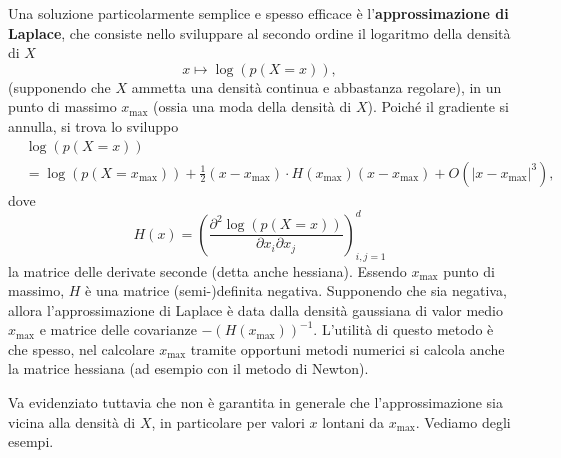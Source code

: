 \documentclass[
  italian,
  letterpaper,
]{book}
\newcommand{\bra}[1]{\left( #1 \right)}
\theoremstyle{definition}
\theoremstyle{remark}
\begin{document}
Una soluzione particolarmente semplice e spesso efficace è
l'\textbf{approssimazione di Laplace}, che consiste nello sviluppare al
secondo ordine il logaritmo della densità di \(X\)
\[ x \mapsto \log( p(X=x)),\] (supponendo che \(X\) ammetta una densità
continua e abbastanza regolare), in un punto di massimo \(x_{{\max}}\)
(ossia una moda della densità di \(X\)). Poiché il gradiente si annulla,
si trova lo sviluppo \[ \begin{split} & \log( p(X = x) ) \\
& = \log( p(X= x_{{\max}})) + \frac  12 (x-x_{{\max}}) \cdot  H(x_{{\max}}) (x-x_{{\max}}) + O( |x-x_{{\max}}|^3),
\end{split}\] dove
\[ H(x) = \bra{ \frac{ \partial^2 \log (p(X=x))}{\partial x_i \partial x_j}}_{i,j=1}^d\]
la matrice delle derivate seconde (detta anche hessiana). Essendo
\(x_{{\max}}\) punto di massimo, \(H\) è una matrice (semi-)definita
negativa. Supponendo che sia negativa, allora l'approssimazione di
Laplace è data dalla densità gaussiana di valor medio \(x_{{\max}}\) e
matrice delle covarianze \(- (H(x_{\max}))^{-1}\). L'utilità di questo
metodo è che spesso, nel calcolare \(x_{{\max}}\) tramite opportuni
metodi numerici si calcola anche la matrice hessiana (ad esempio con il
metodo di Newton).

Va evidenziato tuttavia che non è garantita in generale che
l'approssimazione sia vicina alla densità di \(X\), in particolare per
valori \(x\) lontani da \(x_{{\max}}\). Vediamo degli esempi.
\end{document}
